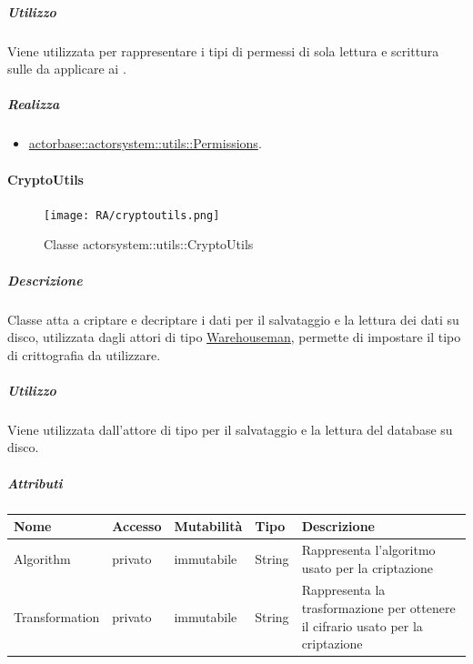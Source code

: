 \documentclass{scalatekids-article}
\begin{document}
\subparagraph{Utilizzo}

Viene utilizzata per rappresentare i tipi di permessi di sola lettura e
scrittura sulle  da applicare ai .

\subparagraph{Realizza}

\begin{itemize}
\item \hyperref[sec:actorbase::actorsystem::utils::Read]{actorbase::actorsystem::utils::Permissions}.
\end{itemize}

\paragraph{CryptoUtils}
\label{sec:actorbase::actorsystem::utils::CryptoUtils}

\begin{figure}[H]
  \begin{center}
    \texttt{[image: RA/cryptoutils.png]}
    \caption{Classe actorsystem::utils::CryptoUtils}
  \end{center}
\end{figure}

\subparagraph{Descrizione}
Classe atta a criptare e decriptare i dati per il salvataggio e la lettura dei dati su disco, utilizzata
dagli attori di tipo \hyperref[sec:actorbase::actorsystem::actors::warehouseman::Warehouseman]{Warehouseman},
permette di impostare il tipo di crittografia da utilizzare.

\subparagraph{Utilizzo}
Viene utilizzata dall'attore di tipo  per il salvataggio e la lettura del database su disco.

\subparagraph{Attributi}
\begin{tabular}{| p{3cm} | p{1.5cm} | p{2cm} | p{2cm} | p{8.5cm} |}
  \hline
  Nome & Accesso & Mutabilità & Tipo & Descrizione\\
  \hline
  Algorithm & privato & immutabile & String & Rappresenta l'algoritmo usato per la criptazione \\
  \hline
  Transformation & privato & immutabile & String & Rappresenta la trasformazione per ottenere il cifrario usato per la criptazione \\
  \hline
\end{tabular}
\end{document}
